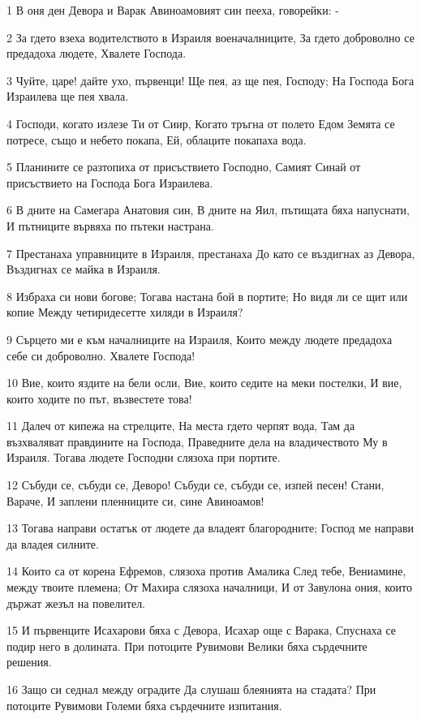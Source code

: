 \par 1 В оня ден Девора и Варак Авиноамовият син пееха, говорейки: -
\par 2 За гдето взеха водителството в Израиля военачалниците, За гдето доброволно се предадоха людете, Хвалете Господа.
\par 3 Чуйте, царе! дайте ухо, първенци! Ще пея, аз ще пея, Господу; На Господа Бога Израилева ще пея хвала.
\par 4 Господи, когато излезе Ти от Сиир, Когато тръгна от полето Едом Земята се потресе, също и небето покапа, Ей, облаците покапаха вода.
\par 5 Планините се разтопиха от присъствието Господно, Самият Синай от присъствието на Господа Бога Израилева.
\par 6 В дните на Самегара Анатовия син, В дните на Яил, пътищата бяха напуснати, И пътниците вървяха по пътеки настрана.
\par 7 Престанаха управниците в Израиля, престанаха До като се въздигнах аз Девора, Въздигнах се майка в Израиля.
\par 8 Избраха си нови богове; Тогава настана бой в портите; Но видя ли се щит или копие Между четиридесетте хиляди в Израиля?
\par 9 Сърцето ми е към началниците на Израиля, Които между людете предадоха себе си доброволно. Хвалете Господа!
\par 10 Вие, които яздите на бели осли, Вие, които седите на меки постелки, И вие, които ходите по път, възвестете това!
\par 11 Далеч от кипежа на стрелците, На места гдето черпят вода, Там да възхваляват правдините на Господа, Праведните дела на владичеството Му в Израиля. Тогава людете Господни слязоха при портите.
\par 12 Събуди се, събуди се, Деворо! Събуди се, събуди се, изпей песен! Стани, Вараче, И заплени пленниците си, сине Авиноамов!
\par 13 Тогава направи остатък от людете да владеят благородните; Господ ме направи да владея силните.
\par 14 Които са от корена Ефремов, слязоха против Амалика След тебе, Вениамине, между твоите племена; От Махира слязоха началници, И от Завулона ония, които държат жезъл на повелител.
\par 15 И първенците Исахарови бяха с Девора, Исахар още с Варака, Спуснаха се подир него в долината. При потоците Рувимови Велики бяха сърдечните решения.
\par 16 Защо си седнал между оградите Да слушаш блеянията на стадата? При потоците Рувимови Големи бяха сърдечните изпитания.
